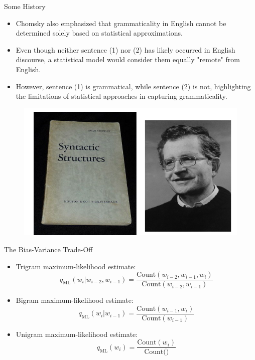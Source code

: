 \documentclass[handout]{beamer}
\begin{document}
\begin{frame}{Some History}
    \scriptsize
    \begin{itemize}
        \item Chomsky also emphasized that grammaticality in English cannot be determined solely based on statistical approximations.
        \item Even though neither sentence (1) nor (2) has likely occurred in English discourse, a statistical model would consider them equally "remote" from English.
        \item However, sentence (1) is grammatical, while sentence (2) is not, highlighting the limitations of statistical approaches in capturing grammaticality.
    \end{itemize}
     \begin{figure}[h]
        	\includegraphics[scale = 0.4]{pics/chomsky.png}
        \end{figure}      
\end{frame}

\begin{frame}{The Bias-Variance Trade-Off}
    \scriptsize
    \begin{itemize}
        \item Trigram maximum-likelihood estimate:
        \[
        q_{\text{ML}}(w_i | w_{i-2}, w_{i-1}) = \frac{{\text{Count}(w_{i-2}, w_{i-1}, w_i)}}{{\text{Count}(w_{i-2}, w_{i-1})}}
        \]
        \item Bigram maximum-likelihood estimate:
        \[
        q_{\text{ML}}(w_i | w_{i-1}) = \frac{{\text{Count}(w_{i-1}, w_i)}}{{\text{Count}(w_{i-1})}}
        \]
        \item Unigram maximum-likelihood estimate:
        \[
        q_{\text{ML}}(w_i) = \frac{{\text{Count}(w_i)}}{{\text{Count()}}}
        \]
    \end{itemize}
\end{frame}
\end{document}
